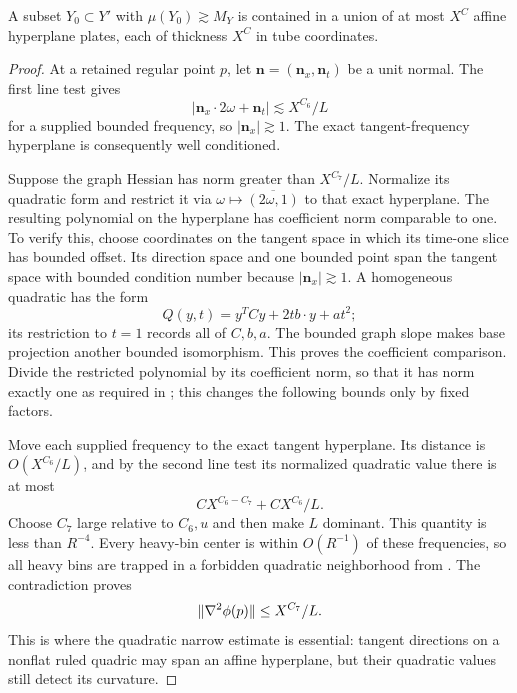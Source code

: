 \begin{proposition}\label{w:geometry}
A subset $Y_0\subset Y'$ with $\mu(Y_0)\gtrsim M_Y$ is contained
in a union of at most $X^C$ affine hyperplane plates, each of thickness
$X^C$ in tube coordinates.
\end{proposition}

\begin{proof}
At a retained regular point $p$, let $\mathbf n=(\mathbf n_x,
\mathbf n_t)$ be a unit normal.  The first line test gives
\[
 |\mathbf n_x\cdot2\omega+\mathbf n_t|\lesssim X^{C_6}/L
\]
for a supplied bounded frequency, so $|\mathbf n_x|\gtrsim1$.
The exact tangent-frequency hyperplane is consequently well conditioned.

Suppose the graph Hessian has norm greater than $X^{C_7}/L$.
Normalize its quadratic form and restrict it via
$\omega\mapsto\overline{(2\omega,1)}$ to that exact hyperplane.
The resulting polynomial on the hyperplane has coefficient norm
comparable to one.  To verify this, choose coordinates on the tangent
space in which its time-one slice has bounded offset.  Its direction
space and one bounded point span the tangent space with bounded
condition number because $|\mathbf n_x|\gtrsim1$.  A homogeneous
quadratic has the form
\[
 Q(y,t)=y^TCy+2t b\cdot y+at^2;
\]
its restriction to $t=1$ records all of $C,b,a$.  The bounded graph
slope makes base projection another bounded isomorphism.  This proves
the coefficient comparison.  Divide the restricted polynomial by its
coefficient norm, so that it has norm exactly one as required in
; this changes the following bounds only by fixed factors.

Move each supplied frequency to the exact tangent hyperplane.  Its
distance is $O(X^{C_6}/L)$, and by the second line test its normalized
quadratic value there is at most
\[
 C X^{C_6-C_7}+C X^{C_6}/L.
\]
Choose $C_7$ large relative to $C_6,u$ and then make $L$ dominant.
This quantity is less than $R^{-4}$.  Every heavy-bin center is within
$O(R^{-1})$ of these frequencies, so all heavy bins are trapped in a
forbidden quadratic neighborhood from .
The contradiction proves
\begin{equation}\label{w:eq-smallhess}
 \lVert \nabla^2\phi(p)\rVert\leq X^{C_7}/L.
\end{equation}
This is where the quadratic narrow estimate is essential: tangent
directions on a nonflat ruled quadric may span an affine hyperplane,
but their quadratic values still detect its curvature.


\end{proof}
